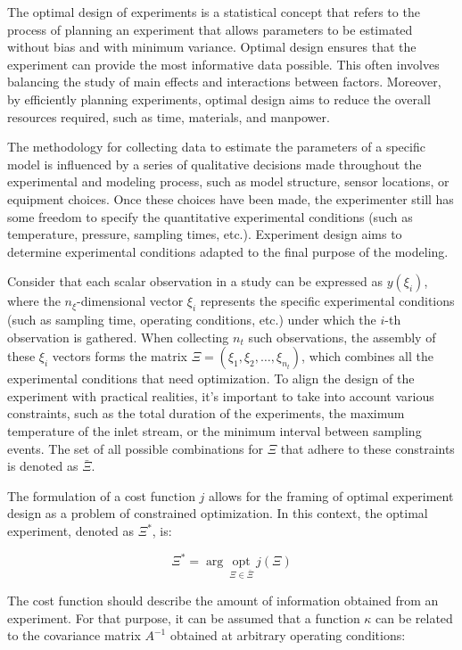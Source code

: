 \documentclass[../Article_Design_of_Experiment.tex]{subfiles}
\begin{document}
	The optimal design of experiments is a statistical concept that refers to the process of planning an experiment that allows parameters to be estimated without bias and with minimum variance. Optimal design ensures that the experiment can provide the most informative data possible. This often involves balancing the study of main effects and interactions between factors. Moreover, by efficiently planning experiments, optimal design aims to reduce the overall resources required, such as time, materials, and manpower.
	
	The methodology for collecting data to estimate the parameters of a specific model is influenced by a series of qualitative decisions made throughout the experimental and modeling process, such as model structure, sensor locations, or equipment choices. Once these choices have been made, the experimenter still has some freedom to specify the quantitative experimental conditions (such as temperature, pressure, sampling times, etc.). Experiment design aims to determine experimental conditions adapted to the final purpose of the modeling.
	
	Consider that each scalar observation in a study can be expressed as $y(\xi_i)$, where the $n_\xi$-dimensional vector $\xi_i$ represents the specific experimental conditions (such as sampling time, operating conditions, etc.) under which the $i$-th observation is gathered. When collecting $n_t$ such observations, the assembly of these $\xi_i$ vectors forms the matrix $\Xi = (\xi_1, \xi_2, \dots, \xi_{n_t})$, which combines all the experimental conditions that need optimization. To align the design of the experiment with practical realities, it's important to take into account various constraints, such as the total duration of the experiments, the maximum temperature of the inlet stream, or the minimum interval between sampling events. The set of all possible combinations for $\Xi$ that adhere to these constraints is denoted as $\bar{\Xi}$.
	
	The formulation of a cost function $j$ allows for the framing of optimal experiment design as a problem of constrained optimization. In this context, the optimal experiment, denoted as $\Xi^*$, is:
	
	{\footnotesize \begin{equation} \Xi^* = \arg~\underset{\Xi \in \bar{\Xi}}{\text{opt}}~j\left(\Xi\right) \end{equation} }
	
	The cost function should describe the amount of information obtained from an experiment. For that purpose, it can be assumed that a function $\kappa$ can be related to the covariance matrix $A^{-1}$ obtained at arbitrary operating conditions:
	
\end{document}
